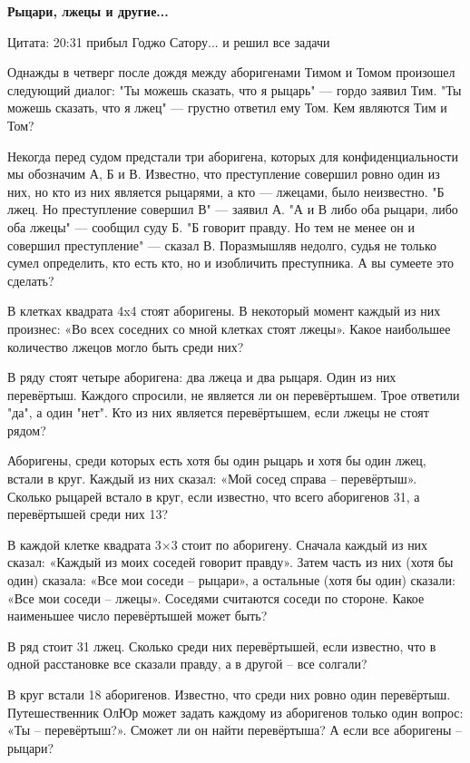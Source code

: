 \centerline{\bf \LARGE Рыцари, лжецы и другие...}

\begin{flushright}
        \scriptsize{Цитата: 20:31 прибыл Годжо Сатору... и решил все задачи}
\end{flushright}

Однажды в четверг после дождя между аборигенами Тимом и Томом произошел следующий диалог: "Ты можешь сказать, что я рыцарь" --- гордо заявил Тим. "Ты можешь сказать, что я лжец" --- грустно ответил ему Том. Кем являются Тим и Том?

Некогда перед судом предстали три аборигена, которых для конфиденциальности мы обозначим А, Б и В. Известно, что преступление совершил ровно один из них, но кто из них является рыцарями, а кто --- лжецами, было неизвестно. "Б лжец. Но преступление совершил В" --- заявил А. "А и В либо оба рыцари, либо оба лжецы" --- сообщил суду Б. "Б говорит правду. Но тем не менее он и совершил преступление" --- сказал В. Поразмышляв недолго, судья не только сумел определить, кто есть кто, но и изобличить преступника. А вы сумеете это сделать?


В клетках квадрата 4x4 стоят аборигены. В некоторый момент каждый из них произнес: «Во всех соседних со мной клетках стоят лжецы». Какое наибольшее количество лжецов могло быть среди них?


В ряду стоят четыре аборигена: два лжеца и два рыцаря. Один из них перевёртыш. Каждого спросили, не является ли он перевёртышем. Трое ответили "да", а один "нет". Кто из них является перевёртышем, если лжецы не стоят рядом?

Аборигены, среди которых есть хотя бы один рыцарь и хотя бы один лжец, встали в круг. Каждый из них сказал: «Мой сосед справа – перевёртыш». Сколько рыцарей встало в круг, если известно, что всего аборигенов 31, а перевёртышей среди них 13?

В каждой клетке квадрата 3×3 стоит по аборигену. Сначала каждый из них сказал: «Каждый из моих соседей говорит правду». Затем часть из них (хотя бы один) сказала: «Все мои соседи – рыцари», а остальные (хотя бы один) сказали: «Все мои соседи – лжецы». Соседями считаются соседи по стороне. Какое наименьшее число перевёртышей может быть?

В ряд стоит 31 лжец. Сколько среди них перевёртышей, если известно, что в одной расстановке все сказали правду, а в другой – все солгали?

В круг встали 18 аборигенов. Известно, что среди них ровно один перевёртыш. Путешественник ОлЮр может задать каждому из аборигенов только один вопрос: «Ты – перевёртыш?». Сможет ли он найти перевёртыша? А если все аборигены – рыцари?



